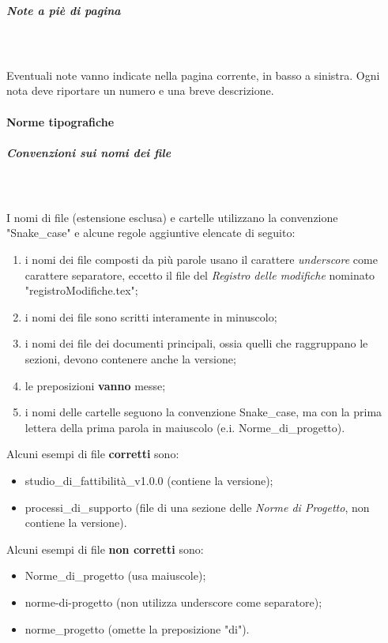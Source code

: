 \subparagraph{Note a piè di pagina}\mbox{} \\ \mbox{} \\
Eventuali note vanno indicate nella pagina corrente, in basso a sinistra. Ogni nota deve riportare un numero e una breve descrizione.

\paragraph{Norme tipografiche}
\subparagraph*{Convenzioni sui nomi dei file}\mbox{} \\ \mbox{} \\
I nomi di file (estensione esclusa) e cartelle utilizzano la convenzione "Snake\_case\glo" e alcune regole aggiuntive elencate di seguito: \begin{enumerate}
\item i nomi dei file composti da più parole usano il carattere \textit{underscore} come carattere separatore, eccetto il file del \textit{Registro delle modifiche} nominato "registroModifiche.tex";
\item i nomi dei file sono scritti interamente in minuscolo;
\item i nomi dei file dei documenti principali, ossia quelli che raggruppano le sezioni, devono contenere anche la versione;
\item le preposizioni \textbf{vanno} messe;
\item i nomi delle cartelle seguono la convenzione Snake\_case, ma con la prima lettera della prima parola in maiuscolo (e.i. Norme\_di\_progetto).
\end{enumerate}
Alcuni esempi di file \textbf{corretti} sono: \begin{itemize}
\item studio\_di\_fattibilità\_v1.0.0 (contiene la versione);
\item processi\_di\_supporto (file di una sezione delle \textit{Norme di Progetto}, non contiene la versione).
\end{itemize}
Alcuni esempi di file \textbf{non corretti} sono: \begin{itemize}
\item Norme\_di\_progetto (usa maiuscole);
\item norme-di-progetto (non utilizza underscore come separatore);
\item norme\_progetto (omette la preposizione "di").
\end{itemize}

